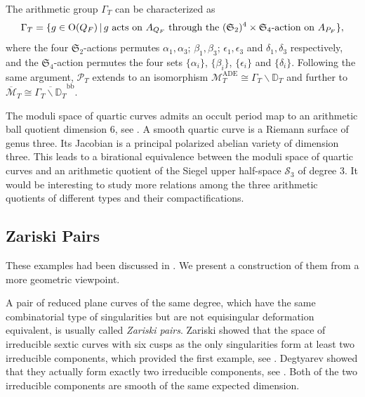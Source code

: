 \documentclass[12pt,reqno,a4paper]{amsart}
\theoremstyle{remark}
\theoremstyle{definition}
\begin{document}
The arithmetic group $\Gamma_{T}$ can be characterized as
\begin{equation*}
    \Gamma_{T} = \{ g\in\mathrm{O}(Q_F) \,|\, g \textup{ acts on } A_{Q_F} \textup{ through the } (\mathfrak{S}_2)^4\times\mathfrak{S}_4\textup{-action on } A_{P_F} \},
\end{equation*}
where the four $\mathfrak{S}_2$-actions permutes $\alpha_1,\alpha_3$; $\beta_1,\beta_3$; $\epsilon_1,\epsilon_3$ and $\delta_1,\delta_3$ respectively, and the $\mathfrak{S}_4$-action permutes the four sets $\{\alpha_i\}$, $\{\beta_i\}$, $\{\epsilon_i\}$ and $\{\delta_i\}$.
Following the same argument, $\mathscr{P}_{T}$ extends to an isomorphism $\mathcal{M}_{T}^{\mathrm{ADE}} \cong \Gamma_{T} \backslash \mathbb{D}_{T}$ and further to $\overline{\mathcal{M}}_{T} \cong \overline{\Gamma_{T} \backslash \mathbb{D}_{T}}^{\mathrm{bb}}$.

The moduli space of quartic curves admits an occult period map to an arithmetic ball quotient dimension $6$, see \cite{kondo2011moduli}.
    A smooth quartic curve is a Riemann surface of genus three.
    Its Jacobian is a principal polarized abelian variety of dimension three. This leads to a birational equivalence between the moduli space of quartic curves and an arithmetic quotient of the Siegel upper half-space $\mathcal{S}_3$ of degree $3$.
    It would be interesting to study more relations among the three arithmetic quotients of different types and their compactifications.








\subsection{Zariski Pairs}
\label{subsec: Zariski pair}
These examples had been discussed in \cite[\S 3]{yang2012discriminantal}.
We present a construction of them from a more geometric viewpoint.



A pair of reduced plane curves of the same degree, which have the same combinatorial type of singularities but are not equisingular deformation equivalent, is usually called \emph{Zariski pairs}.
Zariski showed that the space of irreducible sextic curves with six cusps as the only singularities form at least two irreducible components, which provided the first example, see \cite{zariski1931irregularity}. 
Degtyarev showed that they actually form exactly two irreducible components, see \cite[Theorem 5.3.2]{degtyarev2008deformations}.
Both of the two irreducible components are smooth of the same expected dimension. 
\end{document}
